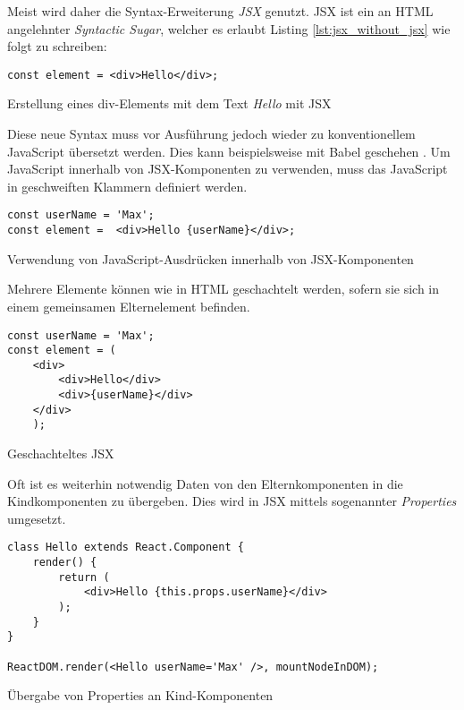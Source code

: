 Meist wird daher die Syntax-Erweiterung \textit{JSX} genutzt. JSX ist ein an HTML angelehnter \textit{Syntactic Sugar}, welcher es erlaubt Listing \ref{lst:jsx_without_jsx} wie folgt zu schreiben:
\begin{listing}[H]
    \begin{verbatim}
const element = <div>Hello</div>;
    \end{verbatim}
    \caption{Erstellung eines div-Elements mit dem Text \textit{Hello} mit JSX}
    \label{lst:jsx_with_jsx}
\end{listing}
Diese neue Syntax muss vor Ausführung jedoch wieder zu konventionellem JavaScript übersetzt werden. Dies kann beispielsweise mit Babel geschehen \cite{facebook_inc._introducing_2016}.
Um JavaScript innerhalb von JSX-Komponenten zu verwenden, muss das JavaScript in geschweiften Klammern definiert werden. 

\begin{listing}[H]
    \begin{verbatim}
const userName = 'Max';
const element =  <div>Hello {userName}</div>;
    \end{verbatim}
    \caption{Verwendung von JavaScript-Ausdrücken innerhalb von JSX-Komponenten}
    \label{lst:embedded_expression}
\end{listing}

Mehrere Elemente können wie in HTML geschachtelt werden, sofern sie sich in einem gemeinsamen Elternelement befinden.

\begin{listing}[H]
    \begin{verbatim}
const userName = 'Max';
const element = (
    <div>
        <div>Hello</div>
        <div>{userName}</div>
    </div>
    );
    \end{verbatim}
    \caption{Geschachteltes JSX}
    \label{lst:jsx_nested}
\end{listing}

Oft ist es weiterhin notwendig Daten von den Elternkomponenten in die Kindkomponenten zu übergeben. Dies wird in JSX mittels sogenannter \textit{Properties} umgesetzt.

\begin{listing}[H]
    \begin{verbatim}
class Hello extends React.Component {
    render() {
        return (
            <div>Hello {this.props.userName}</div>
        );
    }
}

ReactDOM.render(<Hello userName='Max' />, mountNodeInDOM);
    \end{verbatim}
    \caption{Übergabe von Properties an Kind-Komponenten}
    \label{lst:jsx_nested}
\end{listing}



